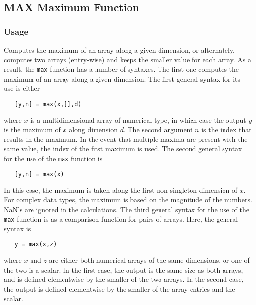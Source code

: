 %
%
%
\subsection{MAX Maximum Function}
\subsubsection{Usage}
Computes the maximum of an array along a given dimension, or alternately, 
computes two arrays (entry-wise) and keeps the smaller value for each array.
As a result, the \verb|max| function has a number of syntaxes.  The first
one computes the maximum of an array along a given dimension.
The first general syntax for its use is either
\begin{verbatim}
   [y,n] = max(x,[],d)
\end{verbatim}
where $x$ is a multidimensional array of numerical type, in which case the
output $y$ is the maximum of $x$ along dimension $d$.  
The second argument $n$ is the index that results in the maximum.
In the event that multiple maxima are present with the same value,
the index of the first maximum is used. 
The second general syntax for the use of the \verb|max| function is
\begin{verbatim}
   [y,n] = max(x)
\end{verbatim} 
In this case, the maximum is taken along the first non-singleton 
dimension of $x$.  For complex data types,
the maximum is based on the magnitude of the numbers.  NaN's are
ignored in the calculations.
The third general syntax for the use of the \verb|max| function is as 
a comparison function for pairs of arrays.  Here, the general syntax is
\begin{verbatim}
   y = max(x,z)
\end{verbatim}
where $x$ and $z$ are either both numerical arrays of the same dimensions,
or one of the two is a scalar.  In the first case, the output is the 
same size as both arrays, and is defined elementwise by the smaller of the
two arrays.  In the second case, the output is defined elementwise by the 
smaller of the array entries and the scalar.

